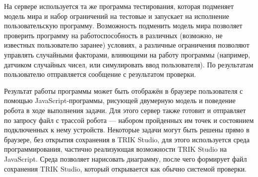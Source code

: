 \documentclass[conference]{IEEEtran}
\begin{document}
На сервере используется та же программа тестирования, которая подменяет модель мира и набор ограничений на тестовые
и запускает на исполнение пользовательскую программу. Возможность подменить модель мира позволяет проверить 
программу на работоспособность в различных (возможно, не известных пользователю заранее) условиях, а различные 
ограничения позволяют управлять случайными факторами, влияющими на работу программы (например, датчиком 
случайных чисел, или симулировать ввод пользователя). По результатам пользователю отправляется сообщение с результатом проверки.

Результат работы программы может быть отображён в браузере пользователя с помощью JavaScript-программы, рисующей 
двумерную модель и поведение робота в ходе выполнения задачи. Для этого сервер также готовит и отправляет по 
запросу файл с трассой робота --- набором пройденных им точек и состоянием подключенных к нему устройств. 
Некоторые задачи могут быть решены прямо в браузере, без открытия сохранения в TRIK Studio, для этого используется 
среда программирования, частично реализующая возможности TRIK Studio на JavaScript. Среда позволяет нарисовать 
диаграмму, после чего формирует файл сохранения TRIK Studio, который открывается как обычно системой проверки.
\end{document}
